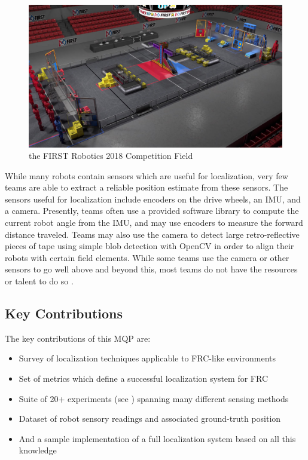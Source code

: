 \documentclass{article}
\newcommand{\Newnameref}[1]{\textit{\nameref{#1}}}
\begin{document}
    \begin{figure}[H]
      \centering
      \includegraphics[width=0.75\linewidth]{./images/FIRST_2018_field.jpg}
      \caption{the FIRST Robotics 2018 Competition Field}
      \label{fig:frc_field}
    \end{figure}

   While many robots contain sensors which are useful for localization, very few teams are able to extract a reliable position estimate from these sensors. The sensors useful for localization include encoders on the drive wheels, an IMU, and a camera. Presently, teams often use a provided software library to compute the current robot angle from the IMU, and may use encoders to measure the forward distance traveled. Teams may also use the camera to detect large retro-reflective pieces of tape using simple blob detection with OpenCV in order to align their robots with certain field elements. While some teams use the camera or other sensors to go well above and beyond this, most teams do not have the resources or talent to do so \cite{balaji_zebravision_2017}. %

  \subsection{Key Contributions}

    The key contributions of this MQP are:
    \begin{itemize}
      \item Survey of localization techniques applicable to FRC-like environments
      \item Set of metrics which define a successful localization system for FRC
      \item Suite of 20+ experiments (see \Newnameref{section:experiments}) spanning many different sensing methods
      \item Dataset of robot sensory readings and associated ground-truth position
      \item And a sample implementation of a full localization system based on all this knowledge
    \end{itemize}
\end{document}
